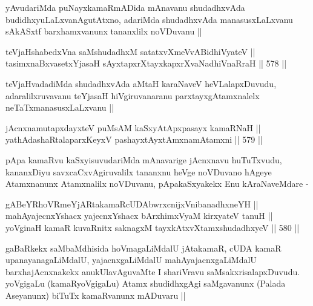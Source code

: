 \begin{artha}
yAvudariMda puNayxkamaRmADida mAnavanu shudadhxvAda
budidhxyuLaLxvanAgutAtxno, adariMda shudadhxvAda manasusxLaLxvanu
sAkASxtf barxhamxvanunx tananxlilx noVDuvanu ||
\end{artha}


\begin{shl}
teVjaHshabedxVna saMshudadhxM satatxvXmeVvABidhiVyateV || \\
tasimxnaBxvasetxYjasaH sAyxtapxrXtayxkapxrXvaNadhiVnaRraH ||  578 ||  
\end{shl}

\begin{artha}
teVjaHvadadiMda shudadhxvAda aMtaH karaNaveV heVLalapxDuvudu,
adaralilxruvavanu teYjasaH hiVgiruvanaranu parxtayxgAtamxnalelx
neTaTxmanasusxLaLxvanu ||
\end{artha}


\begin{shl}
jAcnxnamutapxdayxteV puMsAM kaSxyAtApxpasayx kamaRNaH || \\
yathA\s \s dashaRtalaparxKeyxV pashayxtAyxtAmxnamAtamxni ||  579 ||  
\end{shl}

\begin{artha}
pApa kamaRvu kaSxyisuvudariMda mAnavarige jAcnxnavu huTuTxvudu,
kananxDiyu savxcaCxvAgiruvalilx tananxnu heVge noVDuvano hAgeye
Atamxnanunx Atamxnalilx noVDuvanu, pApakaSxyakekx Enu kAraNaveMdare -
\end{artha}

\begin{shl}
gABeYRhoVRmeYjARtakamaRcUDAbwrxcnijxVnibanadhxneYH || \\
mahAyajecnxYshacx yajecnxYshacx bArxhimxVyaM kirxyateV tanuH || \\
yoVginaH kamaR kuvaRnitx saknagxM tayxkAtxvX\s \s tamxshudadhxyeV ||  580 ||  
\end{shl}

\begin{artha}
gaBaRkekx saMbaMdhisida hoVmagaLiMdalU jAtakamaR, cUDA kamaR
upanayanagaLiMdalU, yajacnxgaLiMdalU mahAyajacnxgaLiMdalU
barxhajAcnxnakekx anukUlavAguvaMte I shariVravu
saMsakxrisalapxDuvudu. yoVgigaLu (kamaRyoVgigaLu) Atamx shudidhxgAgi
saMgavanunx (Palada Aseyanunx) biTuTx kamaRvanunx mADuvaru ||
\end{artha}

